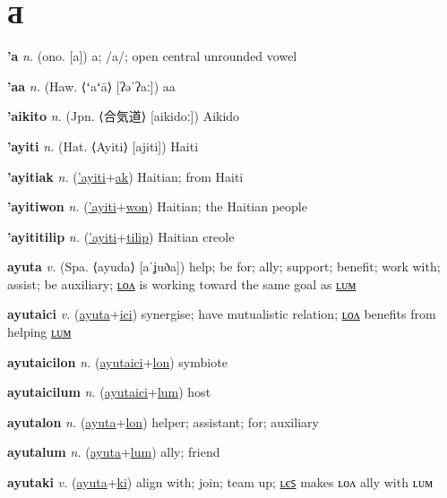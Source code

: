 \section{Ƌ}

\textbf{\hypertarget{'a}{'a}} \textit{n.} (ono. [a])
a; /a/; open central unrounded vowel

\textbf{\hypertarget{'aa}{'aa}} \textit{n.} (Haw. ⟨ʻaʻā⟩ [ʔəˈʔaː])
aa

\textbf{\hypertarget{'aikito}{'aikito}} \textit{n.} (Jpn. ⟨{\japanese{}合気道}⟩ [aikidoː])
Aikido

\textbf{\hypertarget{'ayiti}{'ayiti}} \textit{n.} (Hat. ⟨Ayiti⟩ [ajiti])
Haiti

\textbf{\hypertarget{'ayitiak}{'ayitiak}} \textit{n.} (\hyperlink{'ayiti}{'ayiti}+\allowbreak \hyperlink{ak}{ak})
Haitian; from Haiti

\textbf{\hypertarget{'ayitiwon}{'ayitiwon}} \textit{n.} (\hyperlink{'ayiti}{'ayiti}+\allowbreak \hyperlink{won}{won})
Haitian; the Haitian people

\textbf{\hypertarget{'ayititilip}{'ayititilip}} \textit{n.} (\hyperlink{'ayiti}{'ayiti}+\allowbreak \hyperlink{tilip}{tilip})
Haitian creole

\textbf{\hypertarget{ayuta}{ayuta}} \textit{v.} (Spa. ⟨ayuda⟩ [aˈʝuða])
help; be for; ally; support; benefit; work with; assist; be auxiliary; \hyperlink{ayutalon}{ʟᴏᴧ} is working toward the same goal as \hyperlink{ayutalum}{ʟᴜᴍ}

\textbf{\hypertarget{ayutaici}{ayutaici}} \textit{v.} (\hyperlink{ayuta}{ayuta}+\allowbreak \hyperlink{ici}{ici})
synergise; have mutualistic relation; \hyperlink{ayutaicilon}{ʟᴏᴧ} benefits from helping \hyperlink{ayutaicilum}{ʟᴜᴍ}

\textbf{\hypertarget{ayutaicilon}{ayutaicilon}} \textit{n.} (\hyperlink{ayutaici}{ayutaici}+\allowbreak \hyperlink{lon}{lon})
symbiote

\textbf{\hypertarget{ayutaicilum}{ayutaicilum}} \textit{n.} (\hyperlink{ayutaici}{ayutaici}+\allowbreak \hyperlink{lum}{lum})
host

\textbf{\hypertarget{ayutalon}{ayutalon}} \textit{n.} (\hyperlink{ayuta}{ayuta}+\allowbreak \hyperlink{lon}{lon})
helper; assistant; for; auxiliary

\textbf{\hypertarget{ayutalum}{ayutalum}} \textit{n.} (\hyperlink{ayuta}{ayuta}+\allowbreak \hyperlink{lum}{lum})
ally; friend

\textbf{\hypertarget{ayutaki}{ayutaki}} \textit{v.} (\hyperlink{ayuta}{ayuta}+\allowbreak \hyperlink{ki}{ki})
align with; join; team up; \hyperlink{ayutakiles}{ʟєꜱ} makes ʟᴏᴧ ally with ʟᴜᴍ

